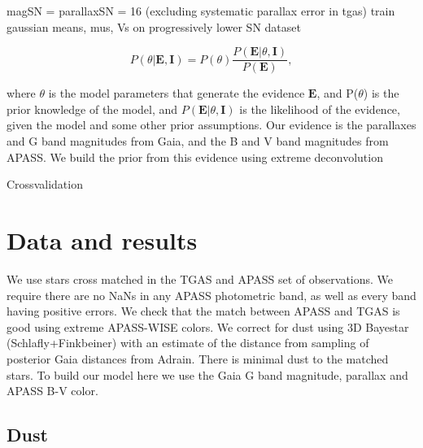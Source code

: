 \documentclass[12pt, preprint]{aastex6}
\begin{document}
magSN = parallaxSN = 16 (excluding systematic parallax error in tgas)
train gaussian means, mus, Vs on progressively lower SN dataset

\begin{equation}
\label{eq:bayes}
P(\theta|\textbf{E}, \textbf{I}) = P(\theta ) \frac{P(\textbf{E} |\theta,\textbf{I})}{P(\textbf{E})},
\end{equation}


where $\theta$ is the model parameters that generate the evidence $\textbf{E}$, and P($\theta$) is the prior knowledge of the model, and $P(\textbf{E} |\theta,\textbf{I})$ is the likelihood of the evidence, given the model and some other prior assumptions. Our evidence is the parallaxes and G band magnitudes from Gaia, and the B and V band magnitudes from APASS. We build the prior from this evidence using extreme deconvolution


Crossvalidation

\section{Data and results}

We use stars cross matched in the TGAS and APASS set of observations. We require there are no NaNs in any APASS photometric band, as well as every band having positive errors. We check that the match between APASS and TGAS is good using extreme APASS-WISE colors. We correct for dust using 3D Bayestar (Schlafly+Finkbeiner) with an estimate of the distance from sampling of posterior Gaia distances from Adrain. There is minimal dust to the matched stars. To build our model here we use the Gaia G band magnitude, parallax and APASS B-V color.

\subsection{Dust}
\end{document}
